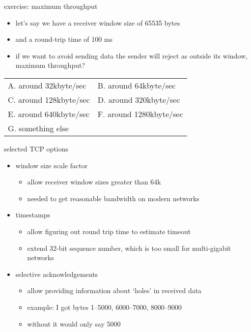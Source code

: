 \begin{frame}{exercise: maximum throughput}
    \begin{itemize}
    \item let's say we have a receiver window size of 65535 bytes
    \item and a round-trip time of 100 ms
    \vspace{.5cm}
    \item if we want to avoid sending data the sender will reject as outside
    its window, maximum throughput?
    \end{itemize}
\begin{tabular}{ll}
A. around 32kbyte/sec &
B. around 64kbyte/sec \\
C. around 128kbyte/sec &
D. around 320kbyte/sec \\
E. around 640kbyte/sec &
F. around 1280kbyte/sec \\
G. something else \\
\end{tabular}
\end{frame}

\begin{frame}{selected TCP options}
    \begin{itemize}
    \item window size scale factor
        \begin{itemize}
        \item allow receiver window sizes greater than 64k
        \item needed to get reasonable bandwidth on modern networks
        \end{itemize}
    \item timestamps
        \begin{itemize}
        \item allow figuring out round trip time to estimate timeout
        \item extend 32-bit sequence number, which is too small for multi-gigabit networks
        \end{itemize}
    \item selective acknowledgements
        \begin{itemize}
        \item allow providing information about `holes' in received data
        \item example: I got bytes 1--5000, 6000--7000, 8000--9000
        \item without it would only say 5000
        \end{itemize}
    \end{itemize}
\end{frame}

